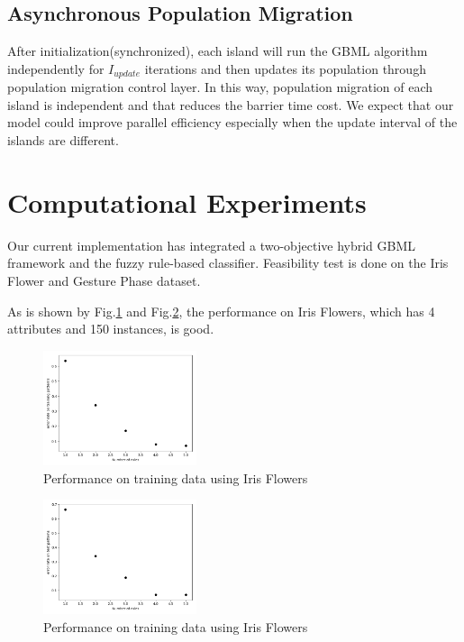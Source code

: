 \documentclass[conference]{IEEEtran}
\begin{document}
  \subsection{Asynchronous Population Migration}
  After initialization(synchronized), each island will run the GBML algorithm independently for $I_{update}$ iterations and then updates its population through population migration control layer. In this way, population migration of each island is independent and that reduces the barrier time cost. We expect that our model could improve parallel efficiency especially when the update interval of the islands are different. 
  
  
  \section{Computational Experiments}

	 Our current implementation has integrated a two-objective hybrid GBML framework and the fuzzy rule-based classifier. Feasibility test is done on the Iris Flower\cite{Iris} and Gesture Phase dataset\cite{Gphase}. 

   As is shown by Fig.\ref{irisTr} and Fig.\ref{irisT}, the performance on Iris Flowers, which has 4 attributes and 150 instances, is good.
 \begin{figure}[H]
 	\centering
 	\includegraphics[width=0.4\textwidth]{figures/iris.png}
 	\caption{Performance on training data using Iris Flowers}\label{irisTr}
 \end{figure}
 \begin{figure}[H]
 	\centering
 	\includegraphics[width=0.4\textwidth]{figures/irisTest.png}
 	\caption{Performance on training data using Iris Flowers}\label{irisT}
 \end{figure}
 
\end{document}
